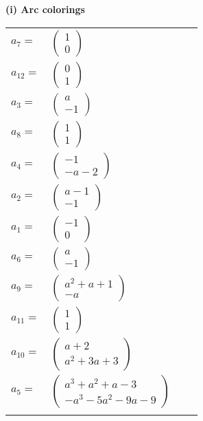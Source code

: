 \documentclass[1p]{elsarticle_modified}
\theoremstyle{definition}
\begin{document}
\flushleft \textbf{(i) Arc colorings}\\
\begin{tabular}{m{7pt} m{180pt} m{7pt} m{180pt} }
\flushright $a_{7}=$&$\begin{pmatrix}1\\0\end{pmatrix}$ \\
\flushright $a_{12}=$&$\begin{pmatrix}0\\1\end{pmatrix}$ \\
\flushright $a_{3}=$&$\begin{pmatrix}a\\-1\end{pmatrix}$ \\
\flushright $a_{8}=$&$\begin{pmatrix}1\\1\end{pmatrix}$ \\
\flushright $a_{4}=$&$\begin{pmatrix}-1\\- a-2\end{pmatrix}$ \\
\flushright $a_{2}=$&$\begin{pmatrix}a-1\\-1\end{pmatrix}$ \\
\flushright $a_{1}=$&$\begin{pmatrix}-1\\0\end{pmatrix}$ \\
\flushright $a_{6}=$&$\begin{pmatrix}a\\-1\end{pmatrix}$ \\
\flushright $a_{9}=$&$\begin{pmatrix}a^2+a+1\\- a\end{pmatrix}$ \\
\flushright $a_{11}=$&$\begin{pmatrix}1\\1\end{pmatrix}$ \\
\flushright $a_{10}=$&$\begin{pmatrix}a+2\\a^2+3 a+3\end{pmatrix}$ \\
\flushright $a_{5}=$&$\begin{pmatrix}a^3+a^2+a-3\\- a^3-5 a^2-9 a-9\end{pmatrix}$\\&\end{tabular}
\end{document}
